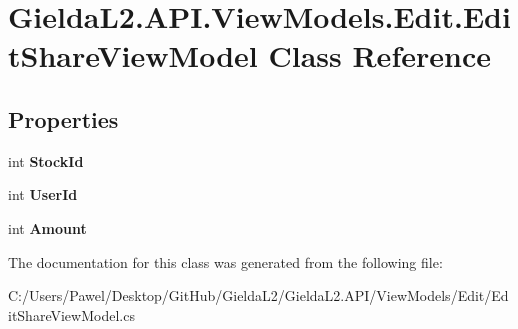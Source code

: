 \hypertarget{class_gielda_l2_1_1_a_p_i_1_1_view_models_1_1_edit_1_1_edit_share_view_model}{}\section{Gielda\+L2.\+A\+P\+I.\+View\+Models.\+Edit.\+Edit\+Share\+View\+Model Class Reference}
\label{class_gielda_l2_1_1_a_p_i_1_1_view_models_1_1_edit_1_1_edit_share_view_model}
\subsection*{Properties}
\begin{DoxyCompactItemize}
\item 
\mbox{\label{class_gielda_l2_1_1_a_p_i_1_1_view_models_1_1_edit_1_1_edit_share_view_model_aa6fd3b3e4f4f0da1db18cbb815496640}} 
int {\bfseries Stock\+Id}
\item 
\mbox{\label{class_gielda_l2_1_1_a_p_i_1_1_view_models_1_1_edit_1_1_edit_share_view_model_a4c883da3027fe288b3498c4734b6dd69}} 
int {\bfseries User\+Id}
\item 
\mbox{\label{class_gielda_l2_1_1_a_p_i_1_1_view_models_1_1_edit_1_1_edit_share_view_model_a682610c18947e80a9cd36b6998c348ac}} 
int {\bfseries Amount}
\end{DoxyCompactItemize}


The documentation for this class was generated from the following file\+:\begin{DoxyCompactItemize}
\item 
C\+:/\+Users/\+Pawel/\+Desktop/\+Git\+Hub/\+Gielda\+L2/\+Gielda\+L2.\+A\+P\+I/\+View\+Models/\+Edit/Edit\+Share\+View\+Model.\+cs\end{DoxyCompactItemize}
